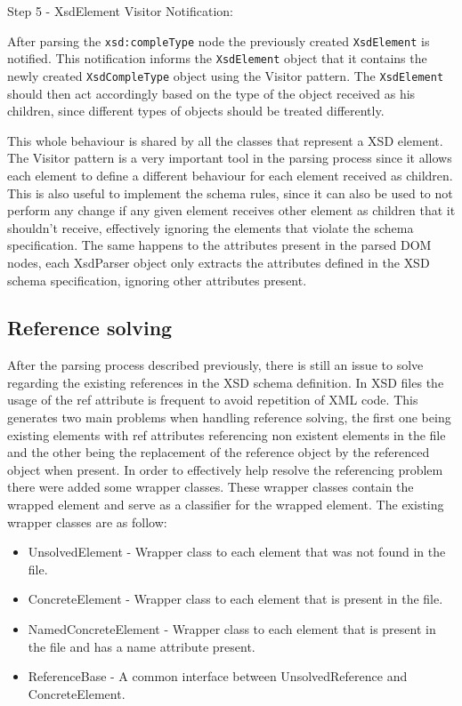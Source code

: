 Step 5 - XsdElement Visitor Notification:

\noindent
After parsing the \texttt{xsd:compleType} node the previously created \texttt{XsdElement} is notified. This notification informs the \texttt{XsdElement} object that it contains the newly created \texttt{XsdCompleType} object using the Visitor pattern. The \texttt{XsdElement} should then act accordingly based on the type of the object received as his children, since different types of objects should be treated differently. 

\noindent
This whole behaviour is shared by all the classes that represent a \ac{XSD} element. The Visitor pattern is a very important tool in the parsing process since it allows each element to define a different behaviour for each element received as children. This is also useful to implement the schema rules, since it can also be used to not perform any change if any given element receives other element as children that it shouldn't receive, effectively ignoring the elements that violate the schema specification. The same happens to the attributes present in the parsed \ac{DOM} nodes, each XsdParser object only extracts the attributes defined in the \ac{XSD} schema specification, ignoring other attributes present.

\subsection{Reference solving}
\label{sec:refsolving}

After the parsing process described previously, there is still an issue to solve regarding the existing references in the \ac{XSD} schema definition. In \ac{XSD} files the usage of the ref attribute is frequent to avoid repetition of \ac{XML} code. This generates two main problems when handling reference solving, the first one being existing elements with ref attributes referencing non existent elements in the file and the other being the replacement of the reference object by the referenced object when present. In order to effectively help resolve the referencing problem there were added some wrapper classes. These wrapper classes contain the wrapped element and serve as a classifier for the wrapped element. The existing wrapper classes are as follow:

\begin{itemize}  
	\item UnsolvedElement - Wrapper class to each element that was not found in the file.
	\item ConcreteElement - Wrapper class to each element that is present in the file.
	\item NamedConcreteElement - Wrapper class to each element that is present in the file and has a name attribute present.
	\item ReferenceBase - A common interface between UnsolvedReference and ConcreteElement.
\end{itemize}

